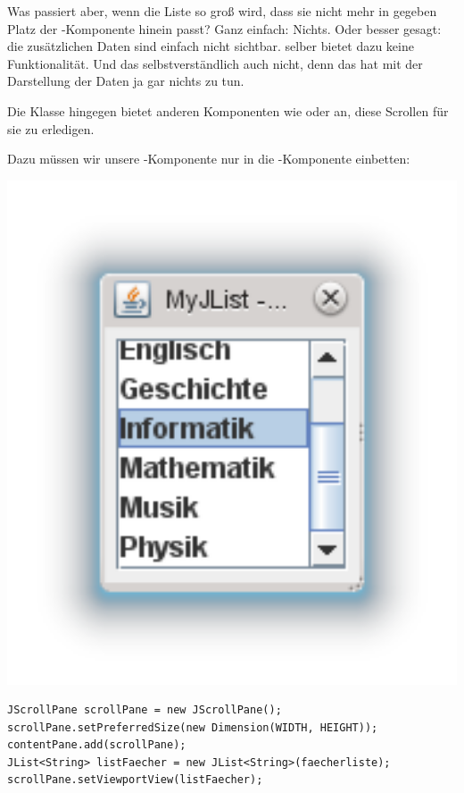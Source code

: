 \begin{minipage}{0.65\textwidth}
Was passiert aber, wenn die Liste so groß wird, dass sie nicht mehr in gegeben
Platz der -Komponente hinein passt? Ganz einfach: Nichts. Oder
besser gesagt: die zusätzlichen Daten sind einfach nicht sichtbar.
 selber bietet dazu keine Funktionalität. Und das
 selbstverständlich auch nicht, denn das hat mit der
Darstellung der Daten ja gar nichts zu tun.

Die Klasse  hingegen bietet anderen Komponenten wie
 oder  an, diese Scrollen für sie zu
erledigen.

Dazu müssen wir unsere -Komponente nur in die
-Komponente einbetten:
\end{minipage}
\begin{minipage}{0.35\textwidth}
\includegraphics[width=1.0\textwidth]{./inf/SEKII/24_Java_GUI-Komponenten/JList_mit_ScrollPane.png}
\end{minipage}

\begin{lstlisting}
JScrollPane scrollPane = new JScrollPane();
scrollPane.setPreferredSize(new Dimension(WIDTH, HEIGHT));
contentPane.add(scrollPane);
JList<String> listFaecher = new JList<String>(faecherliste);
scrollPane.setViewportView(listFaecher);
\end{lstlisting}

